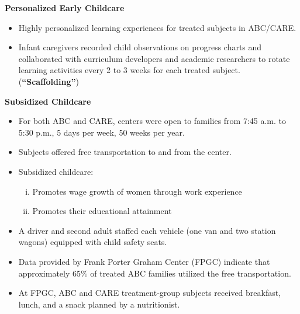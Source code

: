 \documentclass[static]{JJH-Beamer}
\begin{document}

\begin{center}
\textbf{Personalized Early Childcare}
\end{center}
\begin{itemize}
\item Highly personalized learning experiences for treated subjects in ABC/CARE.
\item Infant caregivers recorded child observations on progress charts and collaborated with curriculum developers and academic researchers to rotate learning activities every 2 to 3 weeks for each treated subject. (\textbf{``Scaffolding''})
\end{itemize}

\begin{frame}

\begin{center}
\textbf{Subsidized Childcare}
\end{center}
\begin{itemize}
\item For both ABC and CARE, centers were open to families from 7:45 a.m. to 5:30 p.m., 5 days per week, 50 weeks per year.
\item Subjects offered free transportation to and from the center.
\item Subsidized childcare:
        \begin{enumerate}[(i)]
        \item Promotes wage growth of women through work experience
        \item Promotes their educational attainment
        \end{enumerate}
\end{itemize}

\end{frame}

\clearpage


\begin{itemize}
\item A driver and second adult staffed each vehicle (one van and two station wagons) equipped with child safety seats.
\item Data provided by Frank Porter Graham Center (FPGC) indicate that approximately 65\% of treated ABC families utilized the free transportation.
\item At FPGC, ABC and CARE treatment-group subjects received breakfast, lunch, and a snack planned by a nutritionist.
\end{itemize}
\end{document}
